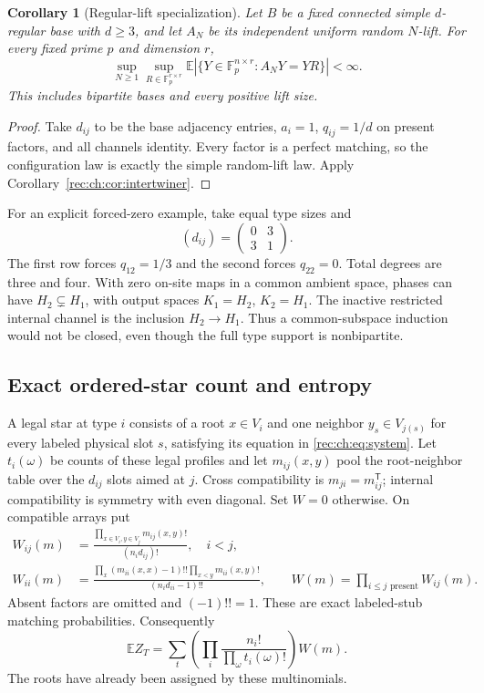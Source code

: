 \documentclass[11pt]{article}
\newtheorem{corollary}[theorem]{Corollary}
\theoremstyle{definition}
\theoremstyle{remark}
\newcommand{\E}{\mathbb E}
\newcommand{\1}{\mathbf 1}
\providecommand{\Fp}{\mathbb F_p}
\begin{document}
\begin{corollary}[Regular-lift specialization]\label{rec:ch:cor:lift}\label{rec:thm:lift-bounded-moment}
Let $B$ be a fixed connected simple $d$-regular base with $d\ge3$,
and let $A_N$ be its independent uniform random $N$-lift.
For every fixed prime $p$ and dimension $r$,
\[
 \sup_{N\ge1}\sup_{R\in\Fp^{r\times r}}
 \E|\{Y\in\Fp^{n\times r}:A_NY=YR\}|<\infty.
\]
This includes bipartite bases and every positive lift size.
\end{corollary}
\begin{proof}
Take $d_{ij}$ to be the base adjacency entries, $a_i=1$,
$q_{ij}=1/d$ on present factors, and all channels identity.
Every factor is a perfect matching, so the configuration law is
exactly the simple random-lift law.
Apply Corollary~\ref{rec:ch:cor:intertwiner}.
\end{proof}

For an explicit forced-zero example, take equal type sizes and
\begin{equation}\label{rec:ch:eq:example}
 (d_{ij})=\begin{pmatrix}0&3\\3&1\end{pmatrix}.
\end{equation}
The first row forces $q_{12}=1/3$ and the second forces $q_{22}=0$. Total degrees are three and four. With zero on-site maps in a common ambient space, phases can have $H_2\subsetneq H_1$, with output spaces $K_1=H_2$, $K_2=H_1$. The inactive restricted internal channel is the inclusion $H_2\to H_1$. Thus a common-subspace induction would not be closed, even though the full type support is nonbipartite.

\subsection{Exact ordered-star count and entropy}
A legal star at type $i$ consists of a root $x\in V_i$ and one neighbor $y_s\in V_{j(s)}$ for every labeled physical slot $s$, satisfying its equation in \eqref{rec:ch:eq:system}. Let $t_i(\omega)$ be counts of these legal profiles and let $m_{ij}(x,y)$ pool the root-neighbor table over the $d_{ij}$ slots aimed at $j$. Cross compatibility is $m_{ji}=m_{ij}^{\mathsf T}$; internal compatibility is symmetry with even diagonal. Set $W=0$ otherwise. On compatible arrays put
\begin{align}
 W_{ij}(m)&=\frac{\prod_{x\in V_i,y\in V_j}m_{ij}(x,y)!}{(n_id_{ij})!},\quad i<j,\label{rec:ch:eq:cross}\\
 W_{ii}(m)&=\frac{\prod_x(m_{ii}(x,x)-1)!!\prod_{x<y}m_{ii}(x,y)!}{(n_id_{ii}-1)!!},
 \qquad W(m)=\prod_{i\le j\text{ present}}W_{ij}(m).
 \label{rec:ch:eq:internal}
\end{align}
Absent factors are omitted and $(-1)!!=1$. These are exact labeled-stub matching probabilities. Consequently
\begin{equation}\label{rec:eq:fmp-exact-types}
 \E Z_T=\sum_t\left(\prod_i\frac{n_i!}{\prod_\omega t_i(\omega)!}\right)W(m).
\end{equation}
The roots have already been assigned by these multinomials.
\end{document}
